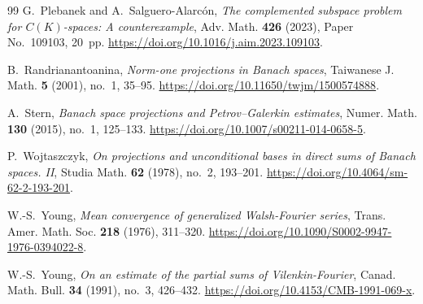 \documentclass[11pt,a4paper,reqno]{amsart}
\theoremstyle{definition}
\numberwithin{equation}{section}
\begin{document}
\begin{thebibliography}{99}
G.~Plebanek and A.~Salguero-Alarc\'on, \emph{The complemented subspace problem for $C(K)$-spaces: A counterexample}, Adv. Math. \textbf{426} (2023), Paper No.~109103, 20~pp. \url{https://doi.org/10.1016/j.aim.2023.109103}.

B.~Randrianantoanina, \emph{Norm-one projections in Banach spaces}, Taiwanese J. Math. \textbf{5} (2001), no.~1, 35--95. \url{https://doi.org/10.11650/twjm/1500574888}.

A.~Stern, \emph{Banach space projections and Petrov--Galerkin estimates}, Numer. Math. \textbf{130} (2015), no.~1, 125--133. \url{https://doi.org/10.1007/s00211-014-0658-5}.

P.~Wojtaszczyk, \emph{On projections and unconditional bases in direct sums of Banach spaces. II}, Studia Math. \textbf{62} (1978), no.~2, 193--201. \url{https://doi.org/10.4064/sm-62-2-193-201}.

W.-S.~Young, \emph{Mean convergence of generalized Walsh-Fourier series}, Trans. Amer. Math. Soc. \textbf{218} (1976), 311--320. \url{https://doi.org/10.1090/S0002-9947-1976-0394022-8}.

W.-S.~Young, \emph{On an estimate of the partial sums of Vilenkin-Fourier}, Canad. Math. Bull. \textbf{34} (1991), no.~3, 426--432. \url{https://doi.org/10.4153/CMB-1991-069-x}.

\end{thebibliography}
\end{document}
